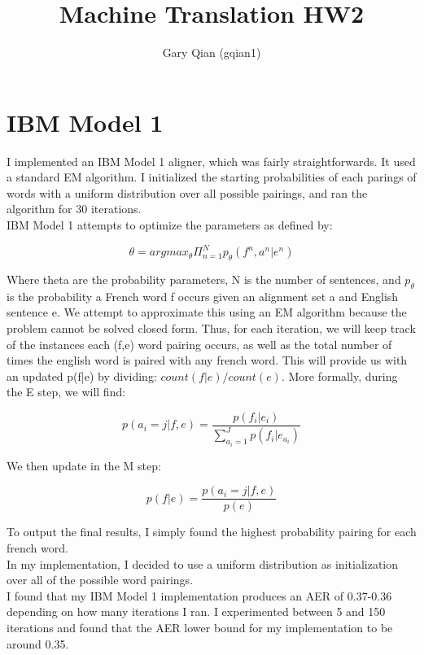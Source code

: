\documentclass{article}
\begin{document}
\title{Machine Translation HW2}
\author{Gary Qian (gqian1)}
\maketitle

\section{IBM Model 1}

I implemented an IBM Model 1 aligner, which was fairly straightforwards. It used a standard EM algorithm. I initialized the starting probabilities of each parings of words with a uniform distribution over all possible pairings, and ran the algorithm for 30 iterations.\\

IBM Model 1 attempts to optimize the parameters as defined by:

\[
\theta = argmax_\theta \Pi^N_{n=1}p_\theta (f^n, a^n | e^n)
\]

Where theta are the probability parameters, N is the number of sentences, and $p_\theta$ is the probability a French word f occurs given an alignment set a and English sentence e. We attempt to approximate this using an EM algorithm because the problem cannot be solved closed form. Thus, for each iteration, we will keep track of the instances each (f,e) word pairing occurs, as well as the total number of times the english word is paired with any french word. This will provide us with an updated p(f|e) by dividing: $count(f|e) / count(e)$. More formally, during the E step, we will find:

\[
p(a_i = j|f,e) = \frac{p(f_i|e_i)}{\sum^J_{a_i=1}p(f_i|e_{a_i})}
\]

We then update in the M step:

\[
p(f|e) = \frac{p(a_i = j|f,e)}{p(e)}
\]

To output the final results, I simply found the highest probability pairing for each french word.\\ 

In my implementation, I decided to use a uniform distribution as initialization over all of the possible word pairings.\\

I found that my IBM Model 1 implementation produces an AER of 0.37-0.36 depending on how many iterations I ran. I experimented between 5 and 150 iterations and found that the AER lower bound for my implementation to be around 0.35.
\end{document}
